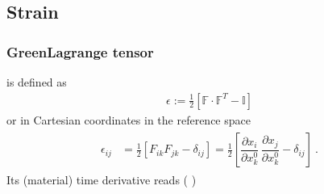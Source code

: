 \documentclass[letterpaper,10pt,english]{jupyterBook}
\begin{document}
\subsection{Strain}
\label{\detokenize{ch/continuum/kinematics:strain}}\label{\detokenize{ch/continuum/kinematics:kinematics-reference-space-strain}}

\subsubsection{Green\sphinxhyphen{}Lagrange tensor}
\label{\detokenize{ch/continuum/kinematics:green-lagrange-tensor}}\label{\detokenize{ch/continuum/kinematics:kinematics-reference-space-strain-green-lagrange}}
\sphinxAtStartPar
{} is defined as
\begin{equation}\label{equation:ch/continuum/kinematics:eq:green-lagrange}
\begin{split}\mathbb{\epsilon} := \frac{1}{2} \left[ \mathbb{F} \cdot \mathbb{F}^T - \mathbb{I} \right]\end{split}
\end{equation}
\sphinxAtStartPar
or in Cartesian coordinates in the reference space
\begin{equation*}
\begin{split}\begin{aligned}
  \epsilon_{ij} 
  & = \frac{1}{2} \left[ F_{ik} F_{jk} - \delta_{ij} \right] 
    = \frac{1}{2} \left[ \dfrac{\partial x_i}{\partial x^0_k} \, \dfrac{\partial x_j}{\partial x^0_k} - \delta_{ij} \right]  \ .
\end{aligned}\end{split}
\end{equation*}
\sphinxAtStartPar
Its (material) time derivative reads ( )
\end{document}

